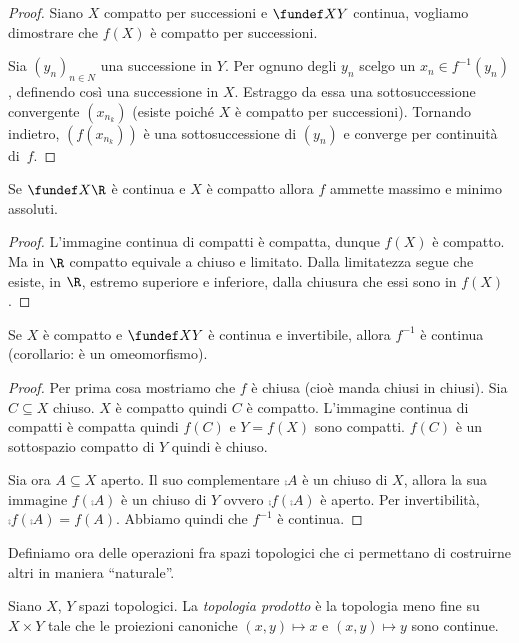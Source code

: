 \begin{proof}
	Siano $X$ compatto per successioni e $\fundef XY$ continua, vogliamo dimostrare che $f(X)$ è compatto per successioni.
	
	Sia $(y_n)_{n\in N}$ una successione in $Y$. Per ognuno degli $y_n$ scelgo un $x_n\in f^{-1}(y_n)$, definendo così una successione in $X$.
	Estraggo da essa una sottosuccessione convergente $(x_{n_k})$ (esiste poiché $X$ è compatto per successioni).
	Tornando indietro, $(f(x_{n_k}))$ è una sottosuccessione di $(y_n)$ e converge per continuità di~$f$.
\end{proof}

\begin{lemma}
	Se $\fundef X\R$ è continua e $X$ è compatto allora $f$ ammette massimo e minimo assoluti.
\end{lemma}

\begin{proof}
	L'immagine continua di compatti è compatta, dunque $f(X)$ è compatto. Ma in $\R$ compatto equivale a chiuso e limitato. Dalla limitatezza segue che esiste, in $\R$, estremo superiore e inferiore, dalla chiusura che essi sono in $f(X)$.
\end{proof}

\begin{lemma}
	Se $X$ è compatto e $\fundef XY$ è continua e invertibile, allora $f^{-1}$ è continua (corollario: è un omeomorfismo).
\end{lemma}

\begin{proof}
	Per prima cosa mostriamo che $f$ è chiusa (cioè manda chiusi in chiusi).
	Sia $C\subseteq X$ chiuso.
	$X$ è compatto quindi $C$ è compatto.
	L'immagine continua di compatti è compatta quindi $f(C)$ e $Y=f(X)$ sono compatti.
	$f(C)$ è un sottospazio compatto di $Y$ quindi è chiuso.
	
	Sia ora $A\subseteq X$ aperto.
	Il suo complementare $\comp A$ è un chiuso di $X$, allora la sua immagine $f(\comp A)$ è un chiuso di $Y$ ovvero $\comp{f(\comp A)}$ è aperto.
	Per invertibilità, $\comp{f(\comp A)}=f(A)$.
	Abbiamo quindi che $f^{-1}$ è continua.
\end{proof}


Definiamo ora delle operazioni fra spazi topologici che ci permettano di costruirne altri in maniera ``naturale''.

\begin{defn}
	Siano $X$, $Y$ spazi topologici.
	La \emph{topologia prodotto} è la topologia meno fine su $X\times Y$ tale che le proiezioni canoniche $(x,y)\mapsto x$ e $(x, y)\mapsto y$	sono continue.
\end{defn}

